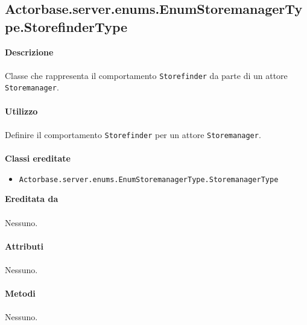 \documentclass[a4paper]{article}
\begin{document}
			\subsection{Actorbase.server.enums.EnumStoremanagerType.StorefinderType}
		\textbf{Descrizione}
			\\ \\
			Classe che rappresenta il comportamento \texttt{Storefinder} da parte di un attore \texttt{Storemanager}.
			\\ \\
		\textbf{Utilizzo}
			\\ \\
			Definire il comportamento \texttt{Storefinder} per un attore \texttt{Storemanager}.
			\\ \\
		\textbf{Classi ereditate}
			\begin{itemize}
				\item \texttt{Actorbase.server.enums.EnumStoremanagerType.StoremanagerType}
			\end{itemize}
		\textbf{Ereditata da}
		\\ \\
		Nessuno.
		\\ \\
		\textbf{Attributi}
		\\ \\
			Nessuno.
		\\ \\
		\textbf{Metodi}
			\\ \\
			Nessuno.
			
\end{document}
